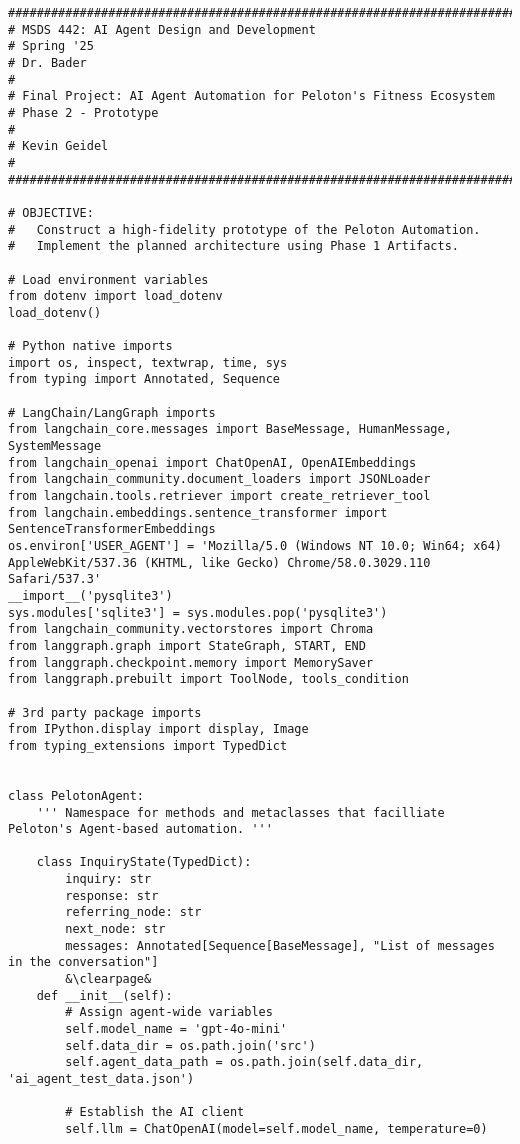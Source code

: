 \documentclass[11pt,letterpaper]{article}
\begin{document}
\begin{lstlisting}
#######################################################################
# MSDS 442: AI Agent Design and Development
# Spring '25
# Dr. Bader
#
# Final Project: AI Agent Automation for Peloton's Fitness Ecosystem
# Phase 2 - Prototype
# 
# Kevin Geidel
#
#######################################################################

# OBJECTIVE:
#   Construct a high-fidelity prototype of the Peloton Automation. 
#   Implement the planned architecture using Phase 1 Artifacts.

# Load environment variables
from dotenv import load_dotenv
load_dotenv()

# Python native imports
import os, inspect, textwrap, time, sys
from typing import Annotated, Sequence

# LangChain/LangGraph imports
from langchain_core.messages import BaseMessage, HumanMessage, SystemMessage
from langchain_openai import ChatOpenAI, OpenAIEmbeddings
from langchain_community.document_loaders import JSONLoader
from langchain.tools.retriever import create_retriever_tool
from langchain.embeddings.sentence_transformer import SentenceTransformerEmbeddings
os.environ['USER_AGENT'] = 'Mozilla/5.0 (Windows NT 10.0; Win64; x64) AppleWebKit/537.36 (KHTML, like Gecko) Chrome/58.0.3029.110 Safari/537.3'
__import__('pysqlite3')
sys.modules['sqlite3'] = sys.modules.pop('pysqlite3')
from langchain_community.vectorstores import Chroma
from langgraph.graph import StateGraph, START, END
from langgraph.checkpoint.memory import MemorySaver
from langgraph.prebuilt import ToolNode, tools_condition

# 3rd party package imports
from IPython.display import display, Image
from typing_extensions import TypedDict


class PelotonAgent:
    ''' Namespace for methods and metaclasses that facilliate Peloton's Agent-based automation. '''

    class InquiryState(TypedDict):
        inquiry: str
        response: str
        referring_node: str
        next_node: str
        messages: Annotated[Sequence[BaseMessage], "List of messages in the conversation"]
        &\clearpage&
    def __init__(self):
        # Assign agent-wide variables
        self.model_name = 'gpt-4o-mini'
        self.data_dir = os.path.join('src')
        self.agent_data_path = os.path.join(self.data_dir, 'ai_agent_test_data.json')        
        
        # Establish the AI client
        self.llm = ChatOpenAI(model=self.model_name, temperature=0)


\end{lstlisting}
\end{document}
